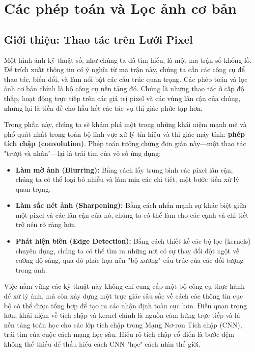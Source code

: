 \section{Các phép toán và Lọc ảnh cơ bản}
\label{sec:basic_image_operations_filtering}

\subsection{Giới thiệu: Thao tác trên Lưới Pixel}
\label{subsec:filtering_intro}

Một hình ảnh kỹ thuật số, như chúng ta đã tìm hiểu, là một ma trận số khổng lồ. Để trích xuất thông tin có ý nghĩa từ ma trận này, chúng ta cần các công cụ để thao tác, biến đổi, và làm nổi bật các cấu trúc quan trọng. Các phép toán và lọc ảnh cơ bản chính là bộ công cụ nền tảng đó. Chúng là những thao tác ở cấp độ thấp, hoạt động trực tiếp trên các giá trị pixel và các vùng lân cận của chúng, nhưng lại là tiền đề cho hầu hết các tác vụ thị giác phức tạp hơn.

Trong phần này, chúng ta sẽ khám phá một trong những khái niệm mạnh mẽ và phổ quát nhất trong toàn bộ lĩnh vực xử lý tín hiệu và thị giác máy tính: \textbf{phép tích chập (convolution)}. Phép toán tưởng chừng đơn giản này—một thao tác "trượt và nhân"—lại là trái tim của vô số ứng dụng:
\begin{itemize}
    \item \textbf{Làm mờ ảnh (Blurring):} Bằng cách lấy trung bình các pixel lân cận, chúng ta có thể loại bỏ nhiễu và làm mịn các chi tiết, một bước tiền xử lý quan trọng.
    \item \textbf{Làm sắc nét ảnh (Sharpening):} Bằng cách nhấn mạnh sự khác biệt giữa một pixel và các lân cận của nó, chúng ta có thể làm cho các cạnh và chi tiết trở nên rõ ràng hơn.
    \item \textbf{Phát hiện biên (Edge Detection):} Bằng cách thiết kế các bộ lọc (kernels) chuyên dụng, chúng ta có thể tìm ra những nơi có sự thay đổi đột ngột về cường độ sáng, qua đó phác họa nên "bộ xương" cấu trúc của các đối tượng trong ảnh.
\end{itemize}

Việc nắm vững các kỹ thuật này không chỉ cung cấp một bộ công cụ thực hành để xử lý ảnh, mà còn xây dựng một trực giác sâu sắc về cách các thông tin cục bộ có thể được tổng hợp để tạo ra các nhận định toàn cục hơn. Điều quan trọng hơn, khái niệm về tích chập và kernel chính là nguồn cảm hứng trực tiếp và là nền tảng toán học cho các lớp tích chập trong Mạng Nơ-ron Tích chập (CNN), trái tim của cuộc cách mạng học sâu. Hiểu rõ tích chập cổ điển là bước đệm không thể thiếu để thấu hiểu cách CNN "học" cách nhìn thế giới.

